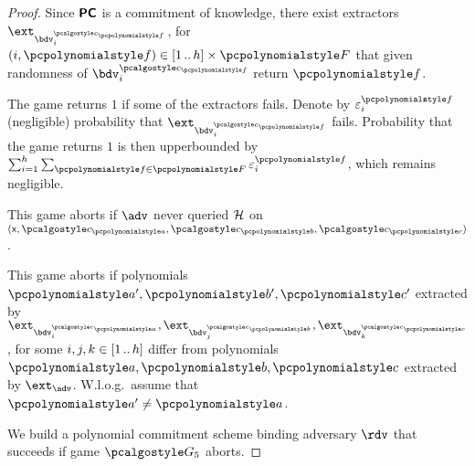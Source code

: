 \documentclass[runningheads,11pt]{llncs}
\begin{document}
\begin{proof}
  Since $\bm{\mathsf{PC}}$ is a commitment of knowledge, there exist extractors
  $\ext_{\bdv^{\cp{f}}_i}$, for
  $(i, \p{f}) \in {\range{1}{h}} \times \p{F}$ that given randomness of
  $\bdv^{\cp{f}}_i$ return $\p{f}$.

  The game returns $1$ if some of the extractors fails. Denote by
  $\eps^{\p{f}}_i$ (negligible) probability that $\ext_{\bdv^{\cp{f}}_i}$
  fails. Probability that the game returns $1$ is then upperbounded by $\sum_{i
    = 1}^h \sum_{\pf \in \p{F}} \eps^{\pf}_i$, which remains negligible.


  This game aborts if $\adv$ never queried $\mathcal{H}$ on $(\inp, \cp{a}, \cp{b},
  \cp{c})$.


  This game aborts if polynomials $\p{a'}, \p{b'}, \p{c'}$ extracted by 
  $\ext_{\bdv^{\cp{a}}_i}, \ext_{\bdv^{\cp{b}}_j}, \ext_{\bdv^{\cp{c}}_k}$, for
  some $i, j, k \in [1 \, .. \, h]$ differ from polynomials $\p{a}, \p{b}, \p{c}$
  extracted by $\ext_\adv$. W.l.o.g.~assume that $\p{a'} \neq \p{a}$.

   
  We
  build a polynomial commitment scheme binding adversary $\rdv$ that succeeds
  if game $\game{5}$ aborts.


\end{proof}
\end{document}

